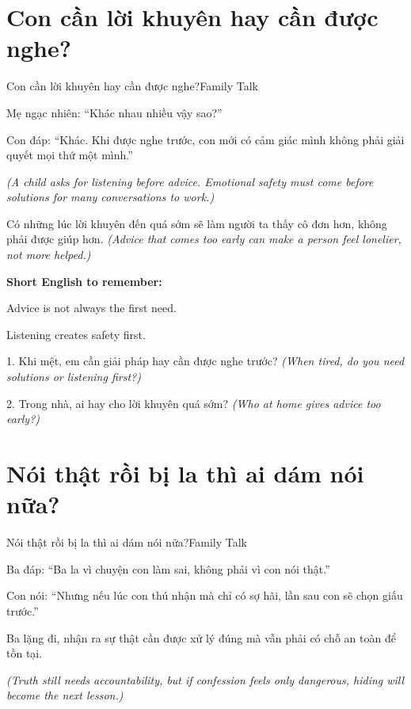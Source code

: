 \section{Con cần lời khuyên hay cần được nghe?}
\begin{truyen}{Con cần lời khuyên hay cần được nghe?}{Family Talk}

Mẹ ngạc nhiên: ``Khác nhau nhiều vậy sao?''

Con đáp: ``Khác. Khi được nghe trước, con mới có cảm giác mình không phải giải quyết mọi thứ một mình.''

\textit{(A child asks for listening before advice. Emotional safety must come before solutions for many conversations to work.)}
\end{truyen}

\begin{baihoc}
Có những lúc lời khuyên đến quá sớm sẽ làm người ta thấy cô đơn hơn, không phải được giúp hơn.
\textit{(Advice that comes too early can make a person feel lonelier, not more helped.)}
\end{baihoc}

\begin{ghinhoanh}
\textbf{Short English to remember:}

Advice is not always the first need.

Listening creates safety first.
\end{ghinhoanh}

\begin{tuhocnhanh}
1. Khi mệt, em cần giải pháp hay cần được nghe trước? \textit{(When tired, do you need solutions or listening first?)}

2. Trong nhà, ai hay cho lời khuyên quá sớm? \textit{(Who at home gives advice too early?)}
\end{tuhocnhanh}
\ngancach

\section{Nói thật rồi bị la thì ai dám nói nữa?}
\begin{truyen}{Nói thật rồi bị la thì ai dám nói nữa?}{Family Talk}

Ba đáp: ``Ba la vì chuyện con làm sai, không phải vì con nói thật.''

Con nói: ``Nhưng nếu lúc con thú nhận mà chỉ có sợ hãi, lần sau con sẽ chọn giấu trước.''

Ba lặng đi, nhận ra sự thật cần được xử lý đúng mà vẫn phải có chỗ an toàn để tồn tại.

\textit{(Truth still needs accountability, but if confession feels only dangerous, hiding will become the next lesson.)}
\end{truyen}

